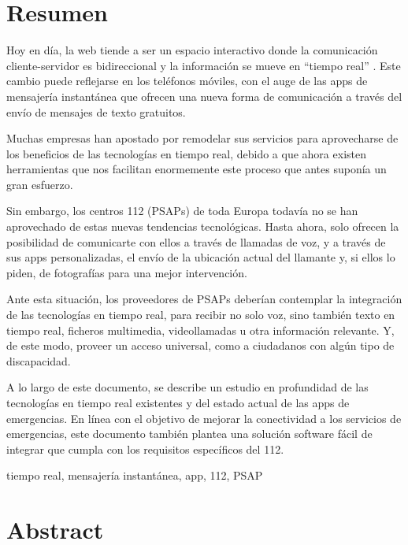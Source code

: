 \chapter*{Resumen}

\begin{abstractEs}
	Hoy en día, la web tiende a ser un espacio interactivo donde la comunicación cliente-servidor es bidireccional y la información se mueve en “tiempo real” \cite{app6}. Este cambio puede reflejarse en los teléfonos móviles, con el auge de las apps de mensajería instantánea que ofrecen una nueva forma de comunicación a través del envío de mensajes de texto gratuitos.

	Muchas empresas han apostado por remodelar sus servicios para aprovecharse de los beneficios de las tecnologías en tiempo real, debido a que ahora existen herramientas que nos facilitan enormemente este proceso que antes suponía un gran esfuerzo.

	Sin embargo, los centros 112 (PSAPs) de toda Europa todavía no se han aprovechado de estas nuevas tendencias tecnológicas. Hasta ahora, solo ofrecen la posibilidad de comunicarte con ellos a través de llamadas de voz, y a través de sus apps personalizadas, el envío de la ubicación actual del llamante y, si ellos lo piden, de fotografías para una mejor intervención.

	Ante esta situación, los proveedores de PSAPs deberían contemplar la integración de las tecnologías en tiempo real, para recibir no solo voz, sino también texto en tiempo real, ficheros multimedia, videollamadas u otra información relevante. Y, de este modo, proveer un acceso universal, como a ciudadanos con algún tipo de discapacidad.

	A lo largo de este documento, se describe un estudio en profundidad de las tecnologías en tiempo real existentes y del estado actual de las apps de emergencias. En línea con el objetivo de mejorar la conectividad a los servicios de emergencias, este documento también  plantea una solución software fácil de integrar que cumpla con los requisitos específicos del 112.
\end{abstractEs}

\begin{keywordsEs}
	tiempo real, mensajería instantánea, app, 112, PSAP
\end{keywordsEs}

\chapter*{Abstract}


